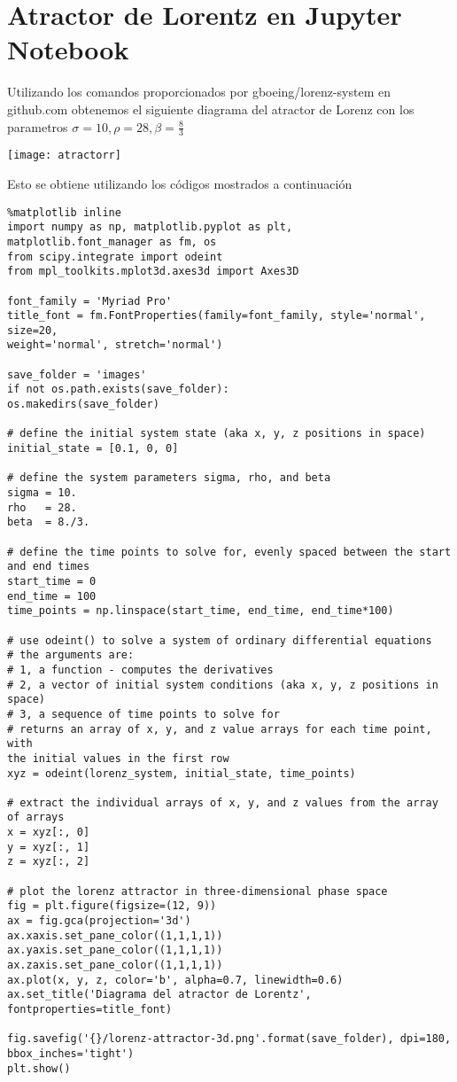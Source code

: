 \documentclass[12pt]{article}
\begin{document}
\newpage
\section*{Atractor de Lorentz en Jupyter Notebook}

Utilizando los comandos proporcionados por gboeing/lorenz-system en github.com obtenemos el siguiente diagrama del atractor de Lorenz con los parametros $\sigma = 10, \rho = 28, \beta = \frac{8}{3}$

\begin{center}
\texttt{[image: atractorr]}
\end{center}

Esto se obtiene utilizando los códigos mostrados a continuación

\begin{verbatim}
%matplotlib inline
import numpy as np, matplotlib.pyplot as plt,
matplotlib.font_manager as fm, os
from scipy.integrate import odeint
from mpl_toolkits.mplot3d.axes3d import Axes3D

font_family = 'Myriad Pro'
title_font = fm.FontProperties(family=font_family, style='normal', size=20, 
weight='normal', stretch='normal')

save_folder = 'images'
if not os.path.exists(save_folder):
os.makedirs(save_folder)
    
# define the initial system state (aka x, y, z positions in space)
initial_state = [0.1, 0, 0]

# define the system parameters sigma, rho, and beta
sigma = 10.
rho   = 28.
beta  = 8./3.

# define the time points to solve for, evenly spaced between the start 
and end times
start_time = 0
end_time = 100
time_points = np.linspace(start_time, end_time, end_time*100)

# use odeint() to solve a system of ordinary differential equations
# the arguments are: 
# 1, a function - computes the derivatives
# 2, a vector of initial system conditions (aka x, y, z positions in space)
# 3, a sequence of time points to solve for
# returns an array of x, y, and z value arrays for each time point, with 
the initial values in the first row
xyz = odeint(lorenz_system, initial_state, time_points)

# extract the individual arrays of x, y, and z values from the array of arrays
x = xyz[:, 0]
y = xyz[:, 1]
z = xyz[:, 2]

# plot the lorenz attractor in three-dimensional phase space
fig = plt.figure(figsize=(12, 9))
ax = fig.gca(projection='3d')
ax.xaxis.set_pane_color((1,1,1,1))
ax.yaxis.set_pane_color((1,1,1,1))
ax.zaxis.set_pane_color((1,1,1,1))
ax.plot(x, y, z, color='b', alpha=0.7, linewidth=0.6)
ax.set_title('Diagrama del atractor de Lorentz', fontproperties=title_font)

fig.savefig('{}/lorenz-attractor-3d.png'.format(save_folder), dpi=180,
bbox_inches='tight')
plt.show()
\end{verbatim}
\end{document}
